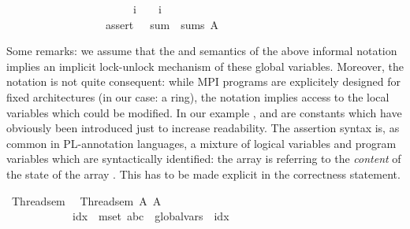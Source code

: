 \begin{isabellebody}
\ \ \ \ \ \ \ \ \ \ \ \ \ \ \ \ \ \ \ \ \ \ \ {\isacharparenleft}{\kern0pt}{\isacharprime}{\kern0pt}{\isacharprime}{\kern0pt}i{\isacharprime}{\kern0pt}{\isacharprime}{\kern0pt}\ {\isacharcolon}{\kern0pt}{\isacharequal}{\kern0pt}\ {\isacharparenleft}{\kern0pt}{\isasymlambda}{\isasymsigma}{\isachardot}{\kern0pt}\ {\isasymsigma}\ {\isacharprime}{\kern0pt}{\isacharprime}{\kern0pt}i{\isacharprime}{\kern0pt}{\isacharprime}{\kern0pt}\ {\isacharplus}{\kern0pt}\ {}{\isacharparenright}{\kern0pt}{\isacharparenright}{\kern0pt}\isanewline
\ \ \ \ \ \ \ \ \ \ \ \ \ \ \ \ \ \ \ \ \ \ {\isacharparenright}{\kern0pt}{\isacharsemicolon}{\kern0pt}\isanewline
\ \ \ \ \ \ \ \ \ \ \ \ \ \ \ \ \ \ assert\ {\isacharparenleft}{\kern0pt}{\isasymlambda}{\isasymsigma}{\isachardot}{\kern0pt}\ {\isasymsigma}\ {\isacharprime}{\kern0pt}{\isacharprime}{\kern0pt}sum{\isacharprime}{\kern0pt}{\isacharprime}{\kern0pt}\ {\isacharequal}{\kern0pt}\ sums\ A{\isacharparenright}{\kern0pt}\isanewline
{\isacartoucheclose}%
\begin{isamarkuptext}%
Some remarks: we assume that the  and  semantics of the
above informal notation implies an implicit lock-unlock mechanism  of these
global variables. Moreover, the notation is not quite consequent: while MPI programs
are explicitely designed for fixed architectures (in our case: a ring), the notation
implies access to the local variables which could be modified. In our example ,
 and  are constants which have obviously been introduced just to increase
readability. The assertion syntax is, as common in PL-annotation languages, a mixture
of logical variables and program variables which are syntactically identified: the array  is
referring to the \emph{content} of the state of the array . This has to be made explicit
in the correctness statement.%
\end{isamarkuptext}\isamarkuptrue%
\isamarkupfalse%
\ Thread{}{\isacharunderscore}{\kern0pt}sem\ \ \isanewline
{\isachardoublequoteopen}Thread{}{\isacharunderscore}{\kern0pt}sem\ A\ A{\isacharprime}{\kern0pt}\ {\isasymequiv}\ \isanewline
\ \ \ \ \ \ \ \ \ \ {\isacharparenleft}{\kern0pt}\ \isactrlbold {\isacharbar}{\kern0pt}\isactrlbold {\isacharbar}{\kern0pt}\isactrlbold {\isacharbar}{\kern0pt}\ idx\ {\isasymin}{\isacharhash}{\kern0pt}\ mset\ {\isacharbrackleft}{\kern0pt}{\isacharprime}{\kern0pt}{\isacharprime}{\kern0pt}a{\isacharprime}{\kern0pt}{\isacharprime}{\kern0pt}{\isacharcomma}{\kern0pt}{\isacharprime}{\kern0pt}{\isacharprime}{\kern0pt}b{\isacharprime}{\kern0pt}{\isacharprime}{\kern0pt}{\isacharcomma}{\kern0pt}{\isacharprime}{\kern0pt}{\isacharprime}{\kern0pt}c{\isacharprime}{\kern0pt}{\isacharprime}{\kern0pt}{\isacharbrackright}{\kern0pt}{\isachardot}{\kern0pt}\ \ global{\isacharunderscore}{\kern0pt}vars\ {\isasymsigma}\ idx\ \ \isanewline

\end{isabellebody}
